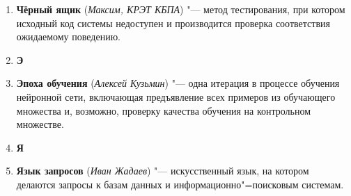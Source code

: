 \documentclass[a4paper, 14 pt]{extarticle}
\begin{document}
\begin{enumerate}
    \item \textbf{Чёрный ящик} (\textit{Максим, КРЭТ КБПА}) "--- метод 
    тестирования, при котором исходный код системы недоступен и производится 
    проверка соответствия ожидаемому поведению.
    \item[] \textbf{Э}
    \item \textbf{Эпоха обучения} (\textit{Алексей Кузьмин}) "--- одна итерация 
    в процессе обучения нейронной сети, включающая предъявление всех примеров из 
    обучающего множества и, возможно, проверку качества обучения на контрольном 
    множестве.\\
    \item[] \textbf{Я}
    \item \textbf{Язык запросов} (\textit{Иван Жадаев}) "--- искусственный язык, 
    на котором делаются запросы к базам данных и информационно"=поисковым 
    системам.

\end{enumerate}
\end{document}
